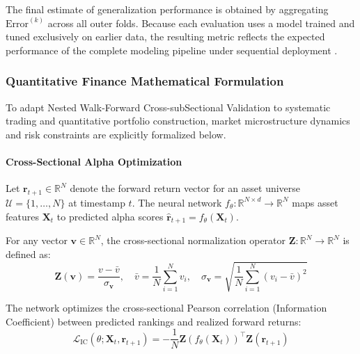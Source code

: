 The final estimate of generalization performance is obtained by aggregating $\mathrm{Error}^{(k)}$ across all outer folds. Because each evaluation uses a model trained and tuned exclusively on earlier data, the resulting metric reflects the expected performance of the complete modeling pipeline under sequential deployment \citep{hyndman2021forecasting, pardo2008evaluation}.

\subsubsection{Quantitative Finance Mathematical Formulation}
To adapt Nested Walk-Forward Cross-subSectional Validation to systematic trading and quantitative portfolio construction, market microstructure dynamics and risk constraints are explicitly formalized below.

\paragraph{Cross-Sectional Alpha Optimization}
Let $\mathbf{r}_{t+1} \in \mathbb{R}^N$ denote the forward return vector for an asset universe $\mathcal{U} = \{1, \dots, N\}$ at timestamp $t$. The neural network $f_\theta: \mathbb{R}^{N \times d} \to \mathbb{R}^N$ maps asset features $\mathbf{X}_t$ to predicted alpha scores $\mathbf{\hat{r}}_{t+1} = f_\theta(\mathbf{X}_t)$.

\begin{definition}
	For any vector $\mathbf{v} \in \mathbb{R}^N$, the cross-sectional normalization operator $\mathbf{Z}: \mathbb{R}^N \to \mathbb{R}^N$ is defined as:
	\begin{equation}
		\mathbf{Z}(\mathbf{v}) = \dfrac{v - \bar{v}}{\sigma_{\mathbf{v}}}, \quad \bar{v} = \dfrac{1}{N}\sum_{i=1}^N v_i, \quad \sigma_{\mathbf{v}} = \sqrt{\dfrac{1}{N}\sum_{i=1}^N (v_i - \bar{v})^2}
	\end{equation}
\end{definition}

\begin{definition}
	The network optimizes the cross-sectional Pearson correlation (Information Coefficient) between predicted rankings and realized forward returns:
	\begin{equation}
		\mathcal{L}_{\text{IC}}(\theta; \mathbf{X}_t, \mathbf{r}_{t+1}) = - \dfrac{1}{N} \mathbf{Z}\left(f_\theta(\mathbf{X}_t)\right)^\top \mathbf{Z}\left(\mathbf{r}_{t+1}\right)
	\end{equation}
\end{definition}

